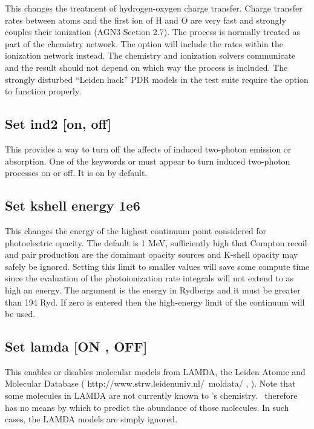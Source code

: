 This changes the treatment of hydrogen-oxygen charge transfer.
Charge
transfer rates between atoms and the first ion of H and O are very fast
and strongly couples their ionization (AGN3 Section 2.7).
The process
is normally treated as part of the chemistry network.
The
 option
will include the rates within the ionization network instead.
The chemistry
and ionization solvers communicate and the result should not depend on
which way the process is included.
The strongly disturbed ``Leiden hack''  PDR
models in the test suite require the
 option to function properly.

\subsection{Set ind2 [on, off]}

This provides a way to turn off the affects of induced two-photon emission
or absorption.
One of the keywords  or  must appear
to turn induced
two-photon processes on or off.
It is on by default.

\subsection{Set kshell energy 1e6}

This changes the energy of the highest continuum point considered for
photoelectric opacity.
The default is 1 MeV, sufficiently high that Compton
recoil and pair production are the dominant opacity sources and K-shell
opacity may safely be ignored.
Setting this limit to smaller values will
save some compute time since the evaluation of the photoionization rate
integrals will not extend to as high an energy.
The argument is the energy
in Rydbergs and it must be greater than 194 Ryd.
If zero is entered then
the high-energy limit of the continuum will be used.

\subsection{Set lamda [ON , OFF]}
\label{sec:SetLamda}
This enables or disables molecular models from LAMDA, the Leiden Atomic and Molecular
Database ( http://www.strw.leidenuniv.nl/~moldata/ , 
\citet{Schoier.F05An-atomic-and-molecular-database-for-analysis}).   
Note that some molecules in LAMDA are not
currently known to \Cloudy 's chemistry.  \Cloudy\ therefore has no means by
which to predict the abundance of those molecules.  In such cases, the
LAMDA models are simply ignored. 


